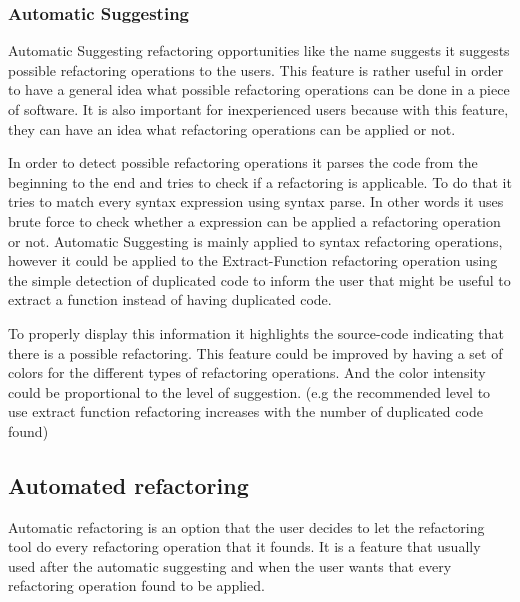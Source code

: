 
\subsubsection{Automatic Suggesting}
Automatic Suggesting refactoring opportunities like the name suggests it suggests
possible refactoring operations to the users.
This feature is rather useful in order to have a general idea what possible refactoring
operations can be done in a piece of software. %
It is also important for inexperienced users because with this feature,
they can have an idea what refactoring operations can be applied or not.


In order to detect possible refactoring operations it parses the code from the
beginning to the end and tries to check if a refactoring is applicable.
To do that it tries to match every syntax expression using syntax parse.
In other words it uses brute force to check whether a expression can be applied
a refactoring operation or not.
Automatic Suggesting is mainly applied to syntax refactoring operations, however
it could be applied to the Extract-Function refactoring operation using the
simple detection of duplicated code to inform the user that might be useful
to extract a function instead of having duplicated code. %

To properly display this information it highlights the source-code indicating
that there is a possible refactoring.
This feature could be improved by having a set of colors for the different types
of refactoring operations. And the color intensity could be proportional to the level
of suggestion. (e.g the recommended level to use extract function refactoring
increases with the number of duplicated code found) %


\subsection{Automated refactoring}
Automatic refactoring is an option that the user decides to let the refactoring
tool do every refactoring operation that it founds. It is a feature that usually used
after the automatic suggesting and when the user wants that every refactoring operation
found to be applied.


